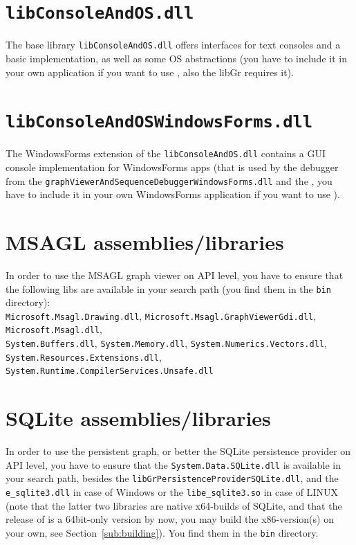 \section{\texttt{libConsoleAndOS.dll}}
The base library \texttt{libConsoleAndOS.dll} offers interfaces for text consoles and a basic implementation, as well as some OS abstractions (you have to include it in your own application if you want to use \GrG, also the libGr requires it).

\section{\texttt{libConsoleAndOSWindowsForms.dll}}
The WindowsForms extension of the \texttt{libConsole\-And\-OS.dll} contains a GUI console implementation for WindowsForms apps (that is used by the debugger from the \texttt{graph\-Viewer\-And\-Sequence\-Debugger\-Windows\-Forms.dll} and the \GGrShell, you have to include it in your own WindowsForms application if you want to use \GrG).

\section{MSAGL assemblies/libraries}
In order to use the MSAGL graph viewer on API level, you have to ensure that the following libs are available in your search path (you find them in the \texttt{bin} directory):\\
\texttt{Microsoft.Msagl.Drawing.dll},
\texttt{Microsoft.Msagl.GraphViewerGdi.dll},
\texttt{Microsoft.Msagl.dll},\\
\texttt{System.Buffers.dll},
\texttt{System.Memory.dll},
\texttt{System.Numerics.Vectors.dll},\\
\texttt{System.Resources.Extensions.dll},
\texttt{System.Runtime.CompilerServices.Unsafe.dll}

\section{SQLite assemblies/libraries}
In order to use the persistent graph, or better the SQLite persistence provider on API level, you have to ensure that the \texttt{System.Data.SQLite.dll} is available in your search path, besides the \texttt{libGrPersistenceProviderSQLite.dll}, and the \texttt{e\_sqlite3.dll} in case of Windows or the \texttt{libe\_sqlite3.so} in case of LINUX (note that the latter two libraries are native x64-builds of SQLite, and that the release of \GrG{} is a 64bit-only version by now, you may build the x86-version(s) on your own, see Section~\ref{sub:building}).
You find them in the \texttt{bin} directory.

